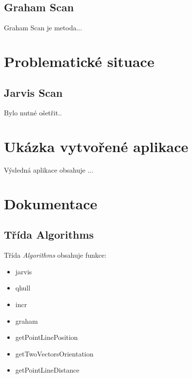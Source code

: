 \documentclass{article}
\begin{document}
\subsection{Graham Scan}
Graham Scan je metoda...\\

\section{Problematické situace}
\subsection{Jarvis Scan}
Bylo nutné ošetřit..

\section{Ukázka vytvořené aplikace}
Výsledná aplikace obsahuje ...
%

\newpage
\section{Dokumentace \label{sec:alg}}
\subsection{Třída Algorithms}
Třída \emph{Algorithms} obsahuje funkce:
\begin{itemize}
\item jarvis
\item qhull
\item incr
\item graham
\item getPointLinePosition
\item getTwoVectorsOrientation
\item getPointLineDistance
\end{itemize}
\end{document}
